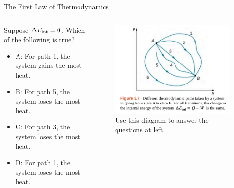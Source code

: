 \documentclass{beamer}
\begin{document}
\begin{frame}{The First Law of Thermodynamics}
\begin{columns}[T]
\begin{column}{0.5\textwidth}
\small Suppose $\Delta E_{\rm int} = 0$.  Which of the following is true?
\begin{itemize}
\item A: For path 1, the system gains the most heat.
\item B: For path 5, the system loses the most heat.
\item C: For path 3, the system loses the most heat.
\item D: For path 1, the system loses the most heat.
\end{itemize}
\end{column}
\begin{column}{0.5\textwidth}
\begin{figure}
\centering
\includegraphics[width=\textwidth]{figures/states1.png}
\caption{\label{fig:states2} Use this diagram to answer the questions at left}
\end{figure}
\end{column}
\end{columns}
\end{frame}
\end{document}
